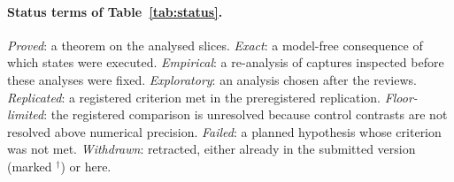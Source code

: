 \paragraph{Status terms of Table~\ref{tab:status}.} \emph{Proved}: a theorem on the analysed
slices. \emph{Exact}: a model-free consequence of which states were executed. \emph{Empirical}: a re-analysis of
captures inspected before these analyses were fixed. \emph{Exploratory}: an analysis chosen after the reviews. \emph{Replicated}: a registered criterion met in the preregistered replication. \emph{Floor-limited}: the
registered comparison is unresolved because control contrasts are not resolved above numerical precision.
\emph{Failed}: a planned hypothesis whose criterion was not met. \emph{Withdrawn}: retracted, either already in the
submitted version (marked $^{\dagger}$) or here.

